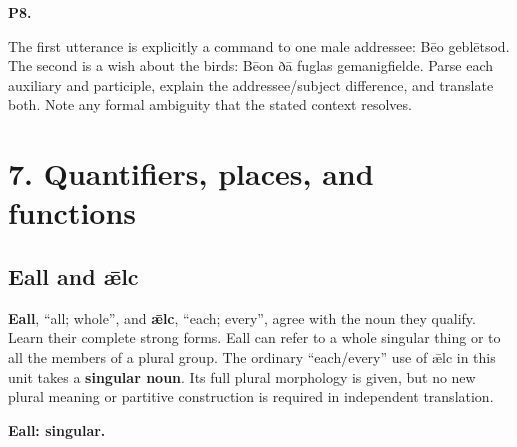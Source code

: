 \par\begin{minipage}{\linewidth}\raggedright
\textbf{P8.}

The first utterance is explicitly a command to one male addressee: Bēo geblētsod. The second is a wish about the birds: Bēon ðā fuglas gemanigfielde. Parse each auxiliary and participle, explain the addressee/\allowbreak{}subject difference, and translate both. Note any formal ambiguity that the stated context resolves.

\end{minipage}\par\addvspace{4pt}

\section*{7. Quantifiers, places, and functions}

\subsection*{Eall and ǣlc}

\textbf{Eall}, “all; whole”, and \textbf{ǣlc}, “each; every”, agree with the noun they qualify. Learn their complete strong forms. Eall can refer to a whole singular thing or to all the members of a plural group. The ordinary “each/\allowbreak{}every” use of ǣlc in this unit takes a \textbf{singular noun}. Its full plural morphology is given, but no new plural meaning or partitive construction is required in independent translation.

\textbf{Eall: singular.}

